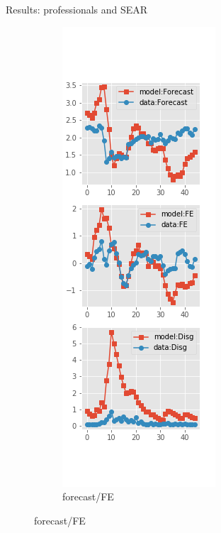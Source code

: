 \documentclass{beamer}
\begin{document}
\begin{frame}{Results: professionals and SEAR}
\begin{figure}[ht]
\begin{subfigure}[b]{0.19\textwidth}
		\end{subfigure}
		\hfill
		\begin{subfigure}[b]{0.19\textwidth}
			\caption{forecast/FE}
			\includegraphics[width=\textwidth, height = 0.8\textheight]{figuresDraft/spf_se_est_diag2.png}

\end{subfigure}
\end{figure}
\end{frame}
\end{document}
